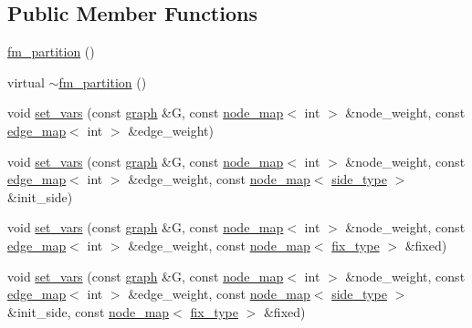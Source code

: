 \subsection*{Public Member Functions}
\begin{DoxyCompactItemize}
\item 
\mbox{\hyperlink{classfm__partition_a69f37c22abf6df5b3778623512240106}{fm\+\_\+partition}} ()
\item 
virtual \mbox{\hyperlink{classfm__partition_ab9d4f12de8f65d42240d94f7924fb319}{$\sim$fm\+\_\+partition}} ()
\item 
void \mbox{\hyperlink{classfm__partition_aa15471da2b6a0f14060b0c4091c6b05c}{set\+\_\+vars}} (const \mbox{\hyperlink{classgraph}{graph}} \&G, const \mbox{\hyperlink{classnode__map}{node\+\_\+map}}$<$ int $>$ \&node\+\_\+weight, const \mbox{\hyperlink{classedge__map}{edge\+\_\+map}}$<$ int $>$ \&edge\+\_\+weight)
\item 
void \mbox{\hyperlink{classfm__partition_af4d1b1275050cc7f4327500cec1f6e88}{set\+\_\+vars}} (const \mbox{\hyperlink{classgraph}{graph}} \&G, const \mbox{\hyperlink{classnode__map}{node\+\_\+map}}$<$ int $>$ \&node\+\_\+weight, const \mbox{\hyperlink{classedge__map}{edge\+\_\+map}}$<$ int $>$ \&edge\+\_\+weight, const \mbox{\hyperlink{classnode__map}{node\+\_\+map}}$<$ \mbox{\hyperlink{classfm__partition_a7cdff1bea3740a287387e8408e16ca79}{side\+\_\+type}} $>$ \&init\+\_\+side)
\item 
void \mbox{\hyperlink{classfm__partition_ad0bebf48731e99fbf7a8c6526ab0f9a6}{set\+\_\+vars}} (const \mbox{\hyperlink{classgraph}{graph}} \&G, const \mbox{\hyperlink{classnode__map}{node\+\_\+map}}$<$ int $>$ \&node\+\_\+weight, const \mbox{\hyperlink{classedge__map}{edge\+\_\+map}}$<$ int $>$ \&edge\+\_\+weight, const \mbox{\hyperlink{classnode__map}{node\+\_\+map}}$<$ \mbox{\hyperlink{classfm__partition_a63693cd93d587dca3d1842f831cd1c55}{fix\+\_\+type}} $>$ \&fixed)
\item 
void \mbox{\hyperlink{classfm__partition_a19ade0d3e19eb40841238c1048c4495b}{set\+\_\+vars}} (const \mbox{\hyperlink{classgraph}{graph}} \&G, const \mbox{\hyperlink{classnode__map}{node\+\_\+map}}$<$ int $>$ \&node\+\_\+weight, const \mbox{\hyperlink{classedge__map}{edge\+\_\+map}}$<$ int $>$ \&edge\+\_\+weight, const \mbox{\hyperlink{classnode__map}{node\+\_\+map}}$<$ \mbox{\hyperlink{classfm__partition_a7cdff1bea3740a287387e8408e16ca79}{side\+\_\+type}} $>$ \&init\+\_\+side, const \mbox{\hyperlink{classnode__map}{node\+\_\+map}}$<$ \mbox{\hyperlink{classfm__partition_a63693cd93d587dca3d1842f831cd1c55}{fix\+\_\+type}} $>$ \&fixed)

\end{DoxyCompactItemize}
